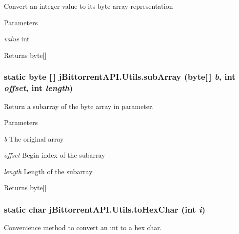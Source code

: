 \label{classj_bittorrent_a_p_i_1_1_utils_a43e8192bb07c969b4ab77a2260f9f3c4}
Convert an integer value to its byte array representation 
\begin{DoxyParams}{Parameters}
\item[{\em value}]int \end{DoxyParams}
\begin{DoxyReturn}{Returns}
byte\mbox{[}\mbox{]} 
\end{DoxyReturn}
\hypertarget{classj_bittorrent_a_p_i_1_1_utils_af11025ce67b4509b7698a0294c301fbd}{
\subsubsection[{subArray}]{\setlength{\rightskip}{0pt plus 5cm}static byte \mbox{[}$\,$\mbox{]} jBittorrentAPI.Utils.subArray (byte\mbox{[}$\,$\mbox{]} {\em b}, \/  int {\em offset}, \/  int {\em length})}}
\label{classj_bittorrent_a_p_i_1_1_utils_af11025ce67b4509b7698a0294c301fbd}
Return a subarray of the byte array in parameter. 
\begin{DoxyParams}{Parameters}
\item[{\em b}]The original array \item[{\em offset}]Begin index of the subarray \item[{\em length}]Length of the subarray \end{DoxyParams}
\begin{DoxyReturn}{Returns}
byte\mbox{[}\mbox{]} 
\end{DoxyReturn}
\hypertarget{classj_bittorrent_a_p_i_1_1_utils_aba1a1c13f197274c7fd1ea8aa361c15f}{
\subsubsection[{toHexChar}]{\setlength{\rightskip}{0pt plus 5cm}static char jBittorrentAPI.Utils.toHexChar (int {\em i})}}
\label{classj_bittorrent_a_p_i_1_1_utils_aba1a1c13f197274c7fd1ea8aa361c15f}
Convenience method to convert an int to a hex char.


